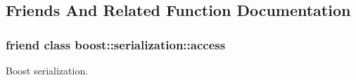 \subsection{Friends And Related Function Documentation}
\hypertarget{class_go_s_u_m_1_1_c_hypercube_ac98d07dd8f7b70e16ccb9a01abf56b9c}{
\subsubsection[{boost\-::serialization\-::access}]{\setlength{\rightskip}{0pt plus 5cm}friend class boost\-::serialization\-::access\hspace{0.3cm}{\ttfamily [friend]}}}\label{class_go_s_u_m_1_1_c_hypercube_ac98d07dd8f7b70e16ccb9a01abf56b9c}


Boost serialization. 



